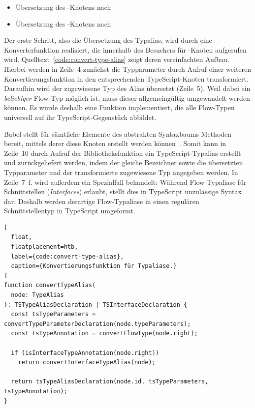 \begin{itemize}
  \item Übersetzung des -Knotens nach 
  \item Übersetzung des -Knotens nach 
\end{itemize}

Der erste Schritt, also die Übersetzung des Typalias, wird durch eine Konverterfunktion realisiert, die innerhalb des Besuchers für -Knoten aufgerufen wird. Quelltext~\ref{code:convert-type-alias} zeigt deren vereinfachten Aufbau. Hierbei werden in Zeile~4 zunächst die Typparameter durch Aufruf einer weiteren Konvertierungsfunktion in den entsprechenden TypeScript-Knoten transformiert. Daraufhin wird der zugewiesene Typ des Alias übersetzt (Zeile~5). Weil dabei ein \emph{beliebiger} Flow-Typ möglich ist, muss dieser allgemeingültig umgewandelt werden können. Es wurde deshalb eine Funktion  implementiert, die alle Flow-Typen universell auf ihr TypeScript-Gegenstück abbildet.

Babel stellt für sämtliche Elemente des abstrakten Syntaxbaums Methoden bereit, mittels derer diese Knoten erstellt werden können~\autocite{BABEL:TYPES}. Somit kann in Zeile~10 durch Aufruf der Bibliotheksfunktion  ein TypeScript-Typalias erstellt und zurückgeliefert werden, indem der gleiche Bezeichner sowie die übersetzten Typparameter und der transformierte zugewiesene Typ angegeben werden. In Zeile~7~f. wird außerdem ein Spezialfall behandelt: Während Flow Typaliase für Schnittstellen (\textit{Interfaces}) erlaubt, stellt dies in TypeScript unzulässige Syntax dar. Deshalb werden derartige Flow-Typaliase in einen regulären Schnittstellentyp in TypeScript umgeformt.

\begin{lstlisting}[
  float,
  floatplacement=htb,
  label={code:convert-type-alias},
  caption={Konvertierungsfunktion für Typaliase.}
]
function convertTypeAlias(
  node: TypeAlias
): TSTypeAliasDeclaration | TSInterfaceDeclaration {
  const tsTypeParameters = convertTypeParameterDeclaration(node.typeParameters);
  const tsTypeAnnotation = convertFlowType(node.right);

  if (isInterfaceTypeAnnotation(node.right))
    return convertInterfaceTypeAlias(node);

  return tsTypeAliasDeclaration(node.id, tsTypeParameters, tsTypeAnnotation);
}
\end{lstlisting}


